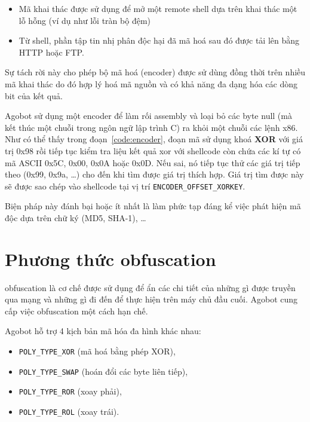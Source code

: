 \begin{itemize}
\item Mã khai thác được sử dụng để mở một remote shell dựa trên khai thác
một lỗ hỗng (ví dụ như lỗi tràn bộ đệm)
\item Từ shell, phần tập tin nhị phân độc hại đã mã hoá sau đó được tải lên bằng HTTP hoặc FTP.
\end{itemize}

Sự tách rời này cho phép bộ mã hoá (encoder) được sử dùng đồng thời trên
nhiều mã khai thác do đó hợp lý hoá mã nguồn
và có khả năng đa dạng hóa các dòng bit của kết quả.

Agobot sử dụng một \gls{encoder} để làm rối \gls{assembly} và loại bỏ các byte null
(mà kết thúc một chuỗi trong ngôn ngữ lập trình C) ra khỏi một chuỗi các lệnh x86.
Như có thể thấy trong đoạn~\ref{code:encoder}, 
đoạn mã sử dụng khoá \textbf{XOR} với giá trị 0x98 rồi tiếp tục kiểm tra liệu kết quả xor với 
shellcode còn chứa các kí tự có mã ASCII 0x5C, 0x00, 0x0A hoặc 0x0D.
Nếu sai, nó tiếp tục thử các giá trị tiếp theo (0x99, 0x9a, \ldots) cho đến khi tìm được giá trị thích hợp.
Giá trị tìm được này sẽ được sao chép vào shellcode tại vị trí \texttt{ENCODER\_OFFSET\_XORKEY}.

Biện pháp này đánh bại hoặc ít nhất là làm phức tạp đáng kể việc phát hiện mã độc dựa trên chữ ký (MD5, SHA-1), \dots


\section{Phương thức obfuscation}
\Gls{obfuscation} là cơ chế được sử dụng để ẩn các chi tiết của những gì được
truyền qua mạng và những gì đi đến để thực hiện trên máy chủ đầu cuối.
Agobot cung cấp việc \gls{obfuscation} một cách hạn chế.

Agobot hỗ trợ 4 kịch bản mã hóa đa hình khác nhau:

\begin{itemize}
\item \verb|POLY_TYPE_XOR| (mã hoá bằng phép XOR),
\item \verb|POLY_TYPE_SWAP| (hoán đổi các byte liên tiếp),
\item \verb|POLY_TYPE_ROR| (xoay phải),
\item \verb|POLY_TYPE_ROL| (xoay trái).
\end{itemize}

